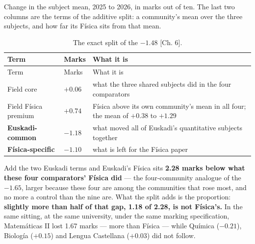 \documentclass[
  10.5pt,
  a4paper,
  DIV=11,
  numbers=noendperiod]{scrartcl}
\begin{document}
Change in the subject mean, 2025 to 2026, in marks out of ten. The last
two columns are the terms of the additive split: a community's mean over
the three subjects, and how far its Física sits from that mean.

\begin{longtable}[]{@{}
  >{\raggedright\arraybackslash}p{}
  >{\raggedleft\arraybackslash}p{}
  >{\raggedright\arraybackslash}p{}@{}}
\caption{The exact split of the \(-1.48\) {[}Ch.
6{]}.}\label{tbl-b-split}\tabularnewline
\toprule\noalign{}
\begin{minipage}[b]{\linewidth}\raggedright
Term
\end{minipage} & \begin{minipage}[b]{\linewidth}\raggedleft
Marks
\end{minipage} & \begin{minipage}[b]{\linewidth}\raggedright
What it is
\end{minipage} \\
\midrule\noalign{}
\endfirsthead
\toprule\noalign{}
\begin{minipage}[b]{\linewidth}\raggedright
Term
\end{minipage} & \begin{minipage}[b]{\linewidth}\raggedleft
Marks
\end{minipage} & \begin{minipage}[b]{\linewidth}\raggedright
What it is
\end{minipage} \\
\midrule\noalign{}
\endhead
\bottomrule\noalign{}
\endlastfoot
Field core & \(+0.06\) & what the three shared subjects did in the four
comparators \\
Field Física premium & \(+0.74\) & Física above its own community's mean
in all four; the mean of \(+0.38\) to \(+1.29\) \\
\textbf{Euskadi-common} & \(\mathbf{-1.18}\) & what moved all of
Euskadi's quantitative subjects together \\
\textbf{Física-specific} & \(\mathbf{-1.10}\) & what is left for the
Física paper \\
\end{longtable}

Add the two Euskadi terms and Euskadi's Física sits \textbf{2.28 marks
below what these four comparators' Física did} --- the four-community
analogue of the \(-1.65\), larger because these four are among the
communities that rose most, and no more a control than the nine are.
What the split adds is the proportion: \textbf{slightly more than half
of that gap, 1.18 of 2.28, is not Física's.} In the same sitting, at the
same university, under the same marking specification, Matemáticas II
lost 1.67 marks --- more than Física --- while Química (\(-0.21\)),
Biología (\(+0.15\)) and Lengua Castellana (\(+0.03\)) did not follow.
\end{document}
